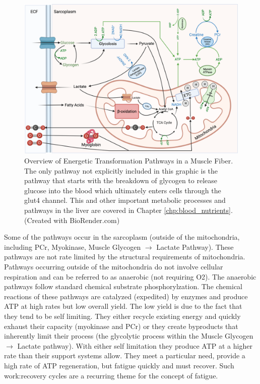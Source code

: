 \begin{figure}[!h]
    \centering
    \includegraphics[width=1\linewidth]{./figure/Energetics_Overview.png}
    \caption{Overview of Energetic Transformation Pathways in a Muscle Fiber. The only pathway not explicitly included in this graphic is the pathway that starts with the breakdown of glycogen to release glucose into the blood which ultimately enters cells through the glut4 channel. This and other important metabolic processes and pathways in the liver are covered in Chapter \ref{chp:blood_nutrients}. (\footnotesize{Created with BioRender.com})}
    \label{fig:Energetics_Overview}
\end{figure}

Some of the pathways occur in the sarcoplasm (outside of the mitochondria, including PCr, Myokinase, Muscle Glycogen $\rightarrow$ Lactate Pathway). These pathways are not rate limited by the structural requirements of mitochondria.  Pathways occurring outside of the mitochondria do not involve cellular respiration and can be referred to as anaerobic (not requiring O2). The anaerobic pathways follow standard chemical substrate phosphorylzation. The chemical reactions of these pathways are catalyzed (expedited) by enzymes and produce ATP at high rates but low overall yield. The low yield is due to the fact that they tend to be self limiting. They either recycle existing energy and quickly exhaust their capacity (myokinase and PCr) or they create byproducts that inherently limit their process (the glycolytic process within the Muscle Glycogen $\rightarrow$ Lactate pathway). With either self limitation they produce ATP at a higher rate than their support systems allow. They meet a particular need, provide a high rate of ATP regeneration, but fatigue quickly and must recover. Such work:recovery cycles are a recurring theme for the concept of fatigue.

